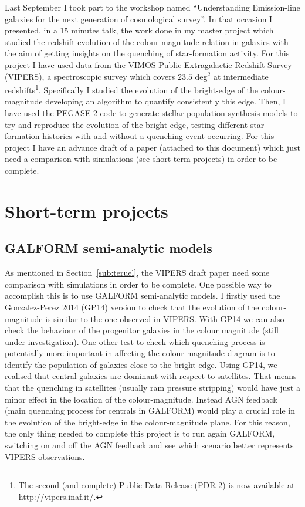 \documentclass[letterpaper]{article}
\begin{document}
Last September I took part to the workshop named ``Understanding Emission-line galaxies for the next generation of cosmological survey''. In that occasion I presented, in a 15 minutes talk, the work done in my master project which studied the redshift evolution of the colour-magnitude relation in galaxies with the aim of getting insights on the quenching of star-formation activity. For this project I have used data from the VIMOS Public Extragalactic Redshift Survey (VIPERS), a spectroscopic survey which covers $23.5$ deg$^2$ at intermediate redshifts\footnote{The second (and complete) Public Data Release (PDR-2) is now available at \url{http://vipers.inaf.it/}. }. Specifically I studied the evolution of the bright-edge of the colour-magnitude developing an algorithm to quantify consistently this edge. Then, I have used the PEGASE 2 code to generate stellar population synthesis models to try and reproduce the evolution of the bright-edge, testing different star formation histories with and without a quenching event occurring. For this project I have an advance draft of a paper (attached to this document) which just need a comparison with simulations (see short term projects) in order to be complete.


\section{Short-term projects}
\label{sec:short}

\subsection{GALFORM semi-analytic models}
As mentioned in Section~\ref{sub:teruel}, the VIPERS draft paper need some comparison with simulations in order to be complete. One possible way to accomplish this is to use GALFORM semi-analytic models. I firstly used the Gonzalez-Perez 2014 (GP14) version to check that the evolution of the colour-magnitude is similar to the one observed in VIPERS. With GP14 we can also check the behaviour of the progenitor galaxies in the colour magnitude (still under investigation). One other test to check which quenching process is potentially more important in affecting the colour-magnitude diagram is to identify the population of galaxies close to the bright-edge. Using GP14, we realised that central galaxies are dominant with respect to satellites. That means that the quenching in satellites (usually ram pressure stripping) would have just a minor effect in the location of the colour-magnitude. Instead AGN feedback (main quenching process for centrals in GALFORM) would play a crucial role in the evolution of the bright-edge in the colour-magnitude plane. For this reason, the only thing needed to complete this project is to run again GALFORM, switching on and off the AGN feedback and see which scenario better represents VIPERS observations. 
\end{document}
